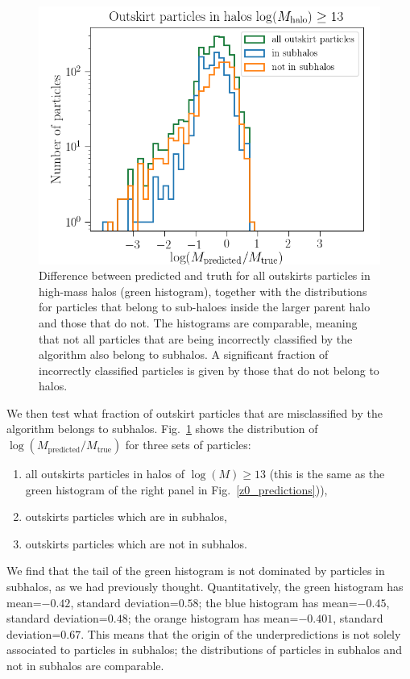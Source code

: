 \documentclass[11pt]{article}
\begin{document}
\begin{figure}
	\centering
	\includegraphics[width=0.65\columnwidth]{z0/outskirt_predictions_in_not_in_subhalo}
	\caption{Difference between predicted and truth for all outskirts particles in high-mass halos (green histogram), together with the distributions for particles that belong to sub-haloes inside the larger parent halo and those that do not. The histograms are comparable, meaning that not all particles that are being incorrectly classified by the algorithm also belong to subhalos. A significant fraction of incorrectly classified particles is given by those that do not belong to halos.}
	\label{subhalo_vs_not_in_subhal_particles}
\end{figure}

We then test what fraction of outskirt particles that are misclassified by the algorithm belongs to subhalos. Fig.~\ref{subhalo_vs_not_in_subhal_particles} shows the distribution of $\log(M_\mathrm{predicted}/M_\mathrm{true})$ for three sets of particles:
\begin{enumerate}
\item all outskirts particles in halos of $\log(M) \geq 13$ (this is the same as the green histogram of the right panel in Fig.~\ref{z0_predictions})),
\item outskirts particles which are in subhalos,
\item outskirts particles which are not in subhalos.
\end{enumerate}

We find that the tail of the green histogram is not dominated by particles in subhalos, as we had previously thought. Quantitatively, the green histogram has mean=$-0.42$, standard deviation=$0.58$; the blue histogram has mean=$-0.45$, standard deviation=$0.48$; the orange histogram has mean=$-0.401$, standard deviation=$0.67$. This means that the origin of the underpredictions is not solely associated to particles in subhalos; the distributions of particles in subhalos and not in subhalos are comparable.
\end{document}
